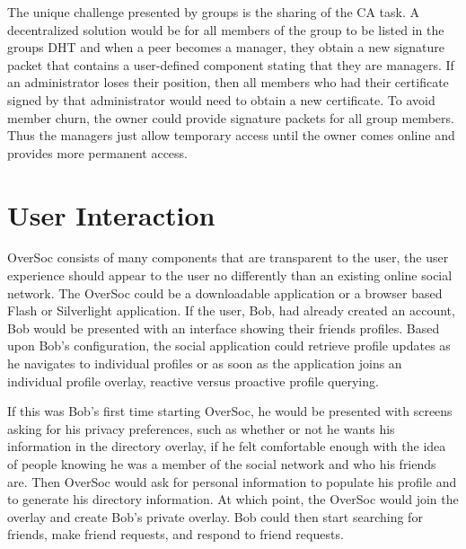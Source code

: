 The unique challenge presented by groups is the sharing of the CA task.  A
decentralized solution would be for all members of the group to be listed in
the groups DHT and when a peer becomes a manager, they obtain a new signature
packet that contains a user-defined component stating that they are managers.
If an administrator loses their position, then all members who had their
certificate signed by that administrator would need to obtain a new
certificate.  To avoid member churn, the owner could provide signature packets
for all group members.  Thus the managers just allow temporary access until the
owner comes online and provides more permanent access.

\section{User Interaction}
\label{vpo:user_interaction}

OverSoc consists of many components that are transparent to the user, the user
experience should appear to the user no differently than an existing online
social network.  The OverSoc could be a downloadable application or a browser
based Flash or Silverlight application.  If the user, Bob, had already created
an account, Bob would be presented with an interface showing their friends
profiles.  Based upon Bob's configuration, the social application could
retrieve profile updates as he navigates to individual profiles or as soon as
the application joins an individual profile overlay, reactive versus proactive
profile querying.  

If this was Bob's first time starting OverSoc, he would be presented with
screens asking for his privacy preferences, such as whether or not he wants his
information in the directory overlay, if he felt comfortable enough with the
idea of people knowing he was a member of the social network and who his
friends are.  Then OverSoc would ask for personal information to populate his
profile and to generate his directory information.  At which point, the OverSoc
would join the overlay and create Bob's private overlay.  Bob could then start
searching for friends, make friend requests, and respond to friend requests.

